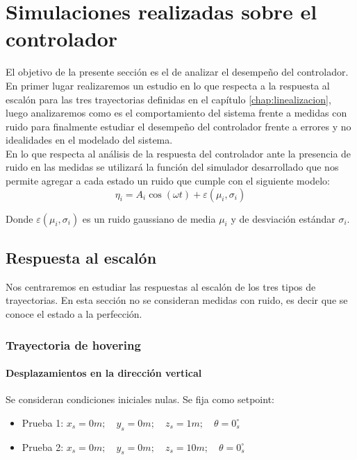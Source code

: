 \documentclass[main]{subfiles}
\begin{document}
\chapter{Simulaciones realizadas sobre el controlador}
\label{chap:sim_control}

El objetivo de la presente secci\'on es el de analizar el desempeño del controlador. En primer lugar realizaremos un estudio en lo que respecta a la respuesta al escal\'on para las tres trayectorias definidas en el cap\'itulo \ref{chap:linealizacion}, luego analizaremos como es el comportamiento del sistema frente a medidas con ruido para finalmente estudiar el desempeño del controlador frente a errores y no idealidades en el modelado del sistema.\\

En lo que respecta al an\'alisis de la respuesta del controlador ante la presencia de ruido en las medidas se utilizar\'a la funci\'on del simulador desarrollado que nos permite agregar a cada estado un ruido que cumple con el siguiente modelo:
\begin{equation}
\label{eq:noise}
\eta_i = A_i\cos(\omega t)+\varepsilon(\mu_i,\sigma_i)
\end{equation}

Donde $\varepsilon(\mu_i,\sigma_i)$ es un ruido gaussiano de media $\mu_i$ y de desviaci\'on est\'andar $\sigma_i$.

\section{Respuesta al escal\'on}
Nos centraremos en estudiar las respuestas al escal\'on de los tres tipos de trayectorias. En esta secci\'on no se consideran medidas con ruido, es decir que se conoce el estado a la perfecci\'on.  

\subsection{Trayectoria de hovering}

\subsubsection{Desplazamientos en la direcci\'on vertical}
Se consideran condiciones iniciales nulas. Se fija como setpoint:
\begin{itemize}
\item Prueba 1: ${x_s = 0 m;\quad y_s = 0 m;\quad z_s = 1 m;\quad \theta = 0_s^\circ}$
\item Prueba 2: ${x_s = 0 m;\quad y_s = 0 m;\quad z_s = 10 m;\quad \theta = 0_s^\circ}$
\end{itemize}
\end{document}
